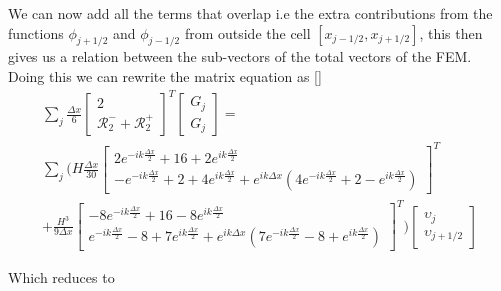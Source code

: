  We can now add all the terms that overlap i.e the extra contributions from the functions $\phi_{j+1/2}$ and $\phi_{j-1/2}$ from outside the cell $\left[x_{j-1/2}, x_{j+1/2}\right]$, this then gives us a relation between the sub-vectors of the total vectors of the FEM. Doing this we can rewrite the matrix equation as
 []
 \begin{multline*}
 \sum_j \frac{\Delta x}{6}\begin{bmatrix} 2  \\ \mathcal{R}^-_2 + \mathcal{R}^+_2 \end{bmatrix}^T \begin{bmatrix} G_j  \\ G_j\end{bmatrix}  = \\\sum_j \Bigg(H\frac{\Delta x}{30}\begin{bmatrix}2e^{-ik\frac{\Delta x}{2}}  + 16  +2 e^{ik\frac{\Delta x}{2}} \\ -e^{-ik\frac{\Delta x}{2}} +  2 + 4e^{ik\frac{\Delta x}{2}} + e^{ik{\Delta x}}\left(4e^{-ik\frac{\Delta x}{2}} +  2 - e^{ik\frac{\Delta x}{2}}\right) \end{bmatrix}^T  \\+ \frac{H^3 }{9\Delta x}\begin{bmatrix}  -8e^{-ik\frac{\Delta x}{2}} +  16  -8e^{ik\frac{\Delta x}{2}} \\  e^{-ik\frac{\Delta x}{2}} -8 + 7e^{ik\frac{\Delta x}{2}}  + e^{ik{\Delta x}}\left(7e^{-ik\frac{\Delta x}{2}} -8 + e^{ik\frac{\Delta x}{2}}  \right)\end{bmatrix}^T    \Bigg) \begin{bmatrix} \upsilon_j  \\ \upsilon_{j+1/2} \end{bmatrix}
 \end{multline*}
 
 Which reduces to
 
